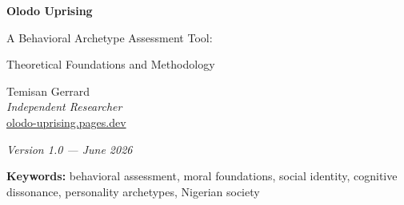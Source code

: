 \documentclass[11pt,a4paper]{article}
\begin{document}
\begin{titlepage}
    \centering
    \vspace*{2cm}
    
    {\Huge\bfseries\color{darkblue} Olodo Uprising\par}
    \vspace{0.5cm}
    {\LARGE A Behavioral Archetype Assessment Tool:\par}
    {\LARGE Theoretical Foundations and Methodology\par}
    \vspace{2cm}
    
    {\large
    Temisan Gerrard\\
    \textit{Independent Researcher}\\
    \vspace{0.5cm}
    \href{https://olodo-uprising.pages.dev}{olodo-uprising.pages.dev}
    \par}
    
    \vspace{2cm}
    
    {\large\textit{Version 1.0 — June 2026}\par}
    
    \vfill
    
    \begin{abstract}
    \noindent\small
    Olodo Uprising is a behavioral archetype assessment tool designed to reveal how individuals would behave if replicated 10,000 times in a shared society. The core question: \textit{Does your presence make society better or worse?} This paper outlines the theoretical foundations, design principles, and methodology behind the assessment. Drawing on five decades of research in personality psychology, moral foundations theory, behavioral economics, and social identity theory, we present a framework for measuring behavioral tendencies that determine societal outcomes. The tool identifies five archetypes—Builder, Sage, Skeptic, Opportunist, and Intellectual—each with distinct behavioral signatures and societal implications. Questions are grounded in real Nigerian social tensions to bypass impression management and reveal authentic behavioral patterns.
    \end{abstract}
    
    \vspace{1cm}
    
    {\small\textbf{Keywords:} behavioral assessment, moral foundations, social identity, cognitive dissonance, personality archetypes, Nigerian society}
    
\end{titlepage}
\end{document}
